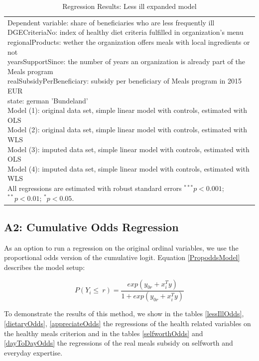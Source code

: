 \documentclass[12pt, a4paper, titlepage]{article}\usepackage[]{graphicx}\usepackage[]{color}
\begin{document}
\begin{table}
\begin{center}
{\begin{tabular}{l c c c c}
\hline
\multicolumn{5}{l}{\scriptsize{\parbox{\linewidth}
{\vspace{2pt} Dependent variable: share of beneficiaries who are less frequently ill \\ DGECriteriaNo: index of healthy diet criteria fulfilled in organization's menu \\ regionalProducts: wether the organization offers meals with local ingredients or not \\ yearsSupportSince: the number of years an organization is already part of the Meals program \\ realSubsidyPerBeneficiary: subsidy per beneficiary of Meals program in 2015 EUR \\ state: german 'Bundeland' \\ Model (1): original data set, simple linear model with controls, estimated with OLS \\ Model (2): original data set, simple linear model with controls, estimated with WLS \\ Model (3): imputed data set, simple linear model with controls, estimated with OLS \\ Model (4): imputed data set, simple linear model with controls, estimated with WLS \\ All regressions are estimated with robust standard errors $^{***}p<0.001$; $^{**}p<0.01$; $^{*}p<0.05$.}}}
\end{tabular}
}
\caption{Regression Results: Less ill expanded model}
\label{expandLessIll}
\end{center}
\end{table}


\subsection{A2: Cumulative Odds Regression} 

As an option to run a regression on the original ordinal variables, we use the proportional odds version of the cumulative logit. Equation \ref{PropoddsModel} describes the model setup: 

 
\begin{equation}
\label{PropoddsModel}
  P(Y_i \leq \ r) = \frac{exp(y_{0r} + x_i^Ty)}{1+exp(y_{0r} + x_i^Ty)}    
\end{equation}


To demonstrate the results of this method, we show in the tables \ref{lessIllOdds}, \ref{dietaryOdds}, \ref{appreciateOdds} the regressions of the health related variables on the healthy meals criterion and in the tables \ref{selfworthOdds} and \ref{dayToDayOdds} the regressions of the real meals subsidy on selfworth and everyday expertise. 
\end{document}

